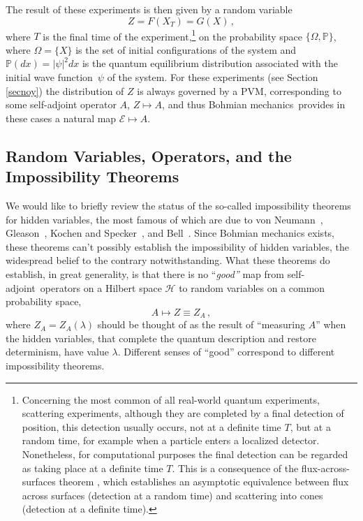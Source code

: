 \documentclass[12pt]{article}
\newcommand{\sa}{self-adjoint}
\newcommand{\BM}{Bohmian mechanics}
\newcommand{\wf}{wave function}
\newcommand{\lam}{\lambda}
\renewcommand{\H}{\mbox{$\mathcal{H}$}}
\newcommand{\E}{\mbox{$\mathscr{E}$}}
\renewcommand{\P}{\mbox{$\mathbb{P}$}}
\newcommand{\rv}{Z}
\begin{document}
The result of these experiments is then given by a random variable $$
{Z}= F(X_T)= G(X)\, ,$$
where $T$ is the final time of the
experiment,\footnote{Concerning the most common of all real-world
   quantum experiments, scattering experiments, although they are
   completed by a final detection of position, this detection usually
   occurs, not at a definite time $T$, but at a random time, for
   example when a particle enters a localized detector. Nonetheless,
   for computational purposes the final detection can be regarded as
   taking place at a definite time $T$. This is a consequence of the
   flux-across-surfaces theorem \cite{dau96,det3,det2}, which
   establishes an asymptotic equivalence between flux across surfaces
   (detection at a random time) and scattering into cones (detection at
   a definite time).} on the probability space $\{ \Omega, {\P} \}$,
where $\Omega=\{ X\}$ is the set of initial configurations of the
system and ${\P}(dx)= |\psi|^2dx$ is the quantum equilibrium
distribution associated with the initial \wf\ $\psi$ of the system.
For these experiments (see Section \ref{secnoy}) the distribution of
${Z}$ is always governed by a PVM, corresponding to some \sa{}
operator $A$, $Z\mapsto A$, and thus \BM\ provides in these cases a
natural map $\E \mapsto A$.


\subsection{Random Variables, Operators, and the Impossibility
   Theorems}
\label{sec:RVOIT}
We would like to briefly review the status of the so-called
impossibility theorems for hidden variables, the most famous of which
are due to von Neumann~\cite{vNe55}, Gleason~\cite{Glea57}, Kochen and
Specker~\cite{KoSp67}, and Bell~\cite{Bel64}.  Since Bohmian mechanics
exists, these theorems can't possibly establish the impossibility of
hidden variables, the widespread belief to the contrary
notwithstanding.  What these theorems do establish, in great
generality, is that there is no ``{\it good''} map {}from \sa\
operators on a Hilbert space \H{} to random variables on a common
probability space,
\begin{equation}\label{dax} A\mapsto {\rv}\equiv {\rv}_A\, ,
\end{equation}
where ${\rv}_A={\rv}_A(\lam)$ should be thought of as the result of
``measuring $A$'' when the hidden variables, that complete the quantum
description and restore determinism, have value $\lam$.  Different
senses of ``good'' correspond to different impossibility theorems.
\end{document}
